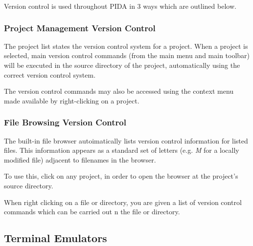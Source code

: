 \documentclass[10pt,a4paper,english]{article}
\begin{document}
Version control is used throughout PIDA in 3 ways which are outlined below.



\hypertarget{project-management-version-control}{}
\subsubsection*{Project Management Version Control}

The project list states the version control system for a project. When a
project is selected, main version control commands (from the main menu and
main toolbar) will be executed in the source directory of the project,
automatically using the correct version control system.

The version control commands may also be accessed using the context menu
made available by right-clicking on a project.



\hypertarget{file-browsing-version-control}{}
\subsubsection*{File Browsing Version Control}

The built-in file browser autoimatically lists version control information
for listed files. This information appears as a standard set of letters
(e.g. \emph{M} for a locally modified file) adjacent to filenames in the browser.

To use this, click on any project, in order to open the browser at the
project's source directory.

When right clicking on a file or directory, you are given a list of version
control commands which can be carried out n the file or directory.



\hypertarget{terminal-emulators}{}
\subsection*{Terminal Emulators}
\end{document}
